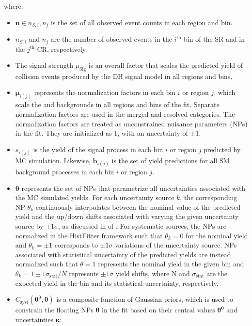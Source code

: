where:

\begin{itemize}
    \item \(\boldsymbol{n}\in{n_{S,i}, n_j}\) is the set of all observed event counts in each region and bin.
    \item \(n_{S,i}\) and \(n_j\) are the number of observed events in the \(i^\text{th}\) bin of the SR and in the \(j^\text{th}\) CR, respectively.
    \item The signal strength \(\mu_\text{Sig}\) is an overall factor that scales the predicted yield of collision events produced by the DH signal model in all regions and bins.
    \item \(\boldsymbol{\mu}_{i(j)}\) represents the normalization factors in each bin \(i\) or region \(j\), which scale the \wjets and \ttbar backgrounds in all regions and bins of the fit. Separate normalization factors are used in the merged and resolved categories. The normalization factors are treated as unconstrained nuisance parameters (NPs) in the fit. They are initialized as 1, with an uncertainty of \(\pm1\).  
    \item \(s_{i(j)}\) is the yield of the signal process in each bin \(i\) or region \(j\) predicted by MC simulation. Likewise, \(\boldsymbol{b}_{i(j)}\) is the set of yield predictions for all SM background processes  in each bin \(i\) or region \(j\).
    \item \(\boldsymbol{\theta}\) represents the set of NPs that parametrize all uncertainties associated with the MC simulated yields. For each uncertainty source \(k\), the corresponding NP \(\theta_k\) continuously interpolates between the nominal value of the predicted yield and the up/down shifts associated with varying the given uncertainty source by \(\pm1\sigma\), as discussed in  of . For systematic sources, the NPs are normalized in the HistFitter framework such that \(\theta_k=0\) for the nominal yield and \(\theta_k=\pm1\) corresponds to \(\pm1\sigma\) variations of the uncertainty source. NPs associated with statistical uncertainty of the predicted yields are instead normalized such that \(\theta=1\) represents the nominal yield in the given bin and \(\theta_k=1\pm1\sigma_\text{stat}/N\) represents \(\pm1\sigma\) yield shifts, where N and \(\sigma_\text{stat}\) are the expected yield in the bin and its statistical uncertainty, respectively. 
    \item \(C_\text{syst}(\boldsymbol{\theta}^0, \boldsymbol{\theta})\) is a composite function of Gaussian priors, which is used to constrain the floating NPs \(\boldsymbol{\theta}\) in the fit based on their central values \(\boldsymbol{\theta^0}\) and uncertainties \(\boldsymbol{\kappa}\):


\end{itemize}
